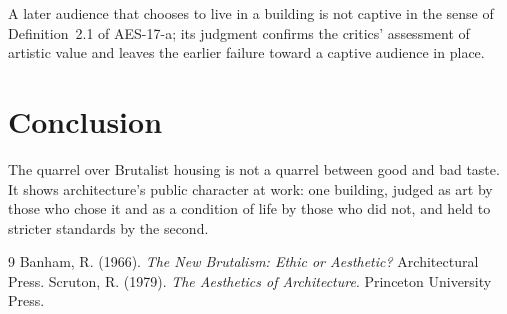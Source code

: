 \documentclass{situationist-preprint}
\begin{document}
\begin{reply}
A later audience that chooses to live in a building is not captive in the sense of Definition~2.1 of AES-17-a; its judgment confirms the critics' assessment of artistic value and leaves the earlier failure toward a captive audience in place.
\end{reply}

\section{Conclusion}

The quarrel over Brutalist housing is not a quarrel between good and bad taste. It shows architecture's public character at work: one building, judged as art by those who chose it and as a condition of life by those who did not, and held to stricter standards by the second.

\begin{thebibliography}{9}\small
{} Banham, R. (1966). \emph{The New Brutalism: Ethic or Aesthetic?} Architectural Press.
 Scruton, R. (1979). \emph{The Aesthetics of Architecture}. Princeton University Press.
\end{thebibliography}
\end{document}
